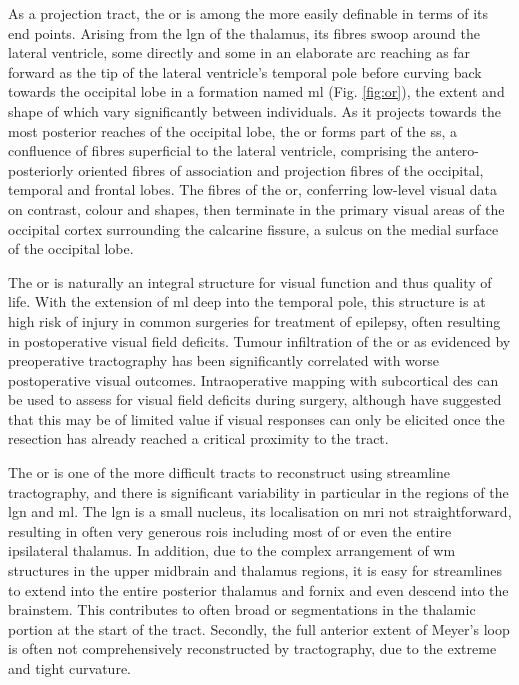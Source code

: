 As a projection tract, the \gls{or} is among the more easily definable in terms of its end points.
Arising from the \gls{lgn} of the thalamus, its fibres swoop around the lateral ventricle, some directly and some in an elaborate arc reaching as far forward as the tip of the lateral ventricle's temporal pole before curving back towards the occipital lobe in a formation named \gls{ml} (Fig. \ref{fig:or})\autocite{Sarubbo2015}, the extent and shape of which vary significantly between individuals\autocite{Ebeling1988,Yogarajah2009}.%
As it projects towards the most posterior reaches of the occipital lobe, the \gls{or} forms part of the \gls{ss}, a confluence of fibres superficial to the lateral ventricle, comprising the antero-posteriorly oriented fibres of association and projection fibres of the occipital, temporal and frontal lobes\autocite{Maldonado2021}.
The fibres of the \gls{or}, conferring low-level visual data on contrast, colour and shapes, then terminate in the primary visual areas of the occipital cortex surrounding the calcarine fissure, a sulcus on the medial surface of the occipital lobe.

The \gls{or} is naturally an integral structure for visual function and thus quality of life.
With the extension of \gls{ml} deep into the temporal pole, this structure is at high risk of injury in common surgeries for treatment of epilepsy, often resulting in postoperative visual field deficits\autocite{Lacerda2020}.
Tumour infiltration of the \gls{or} as evidenced by preoperative tractography has been significantly correlated with worse postoperative visual outcomes\autocite{Soumpasis2023}.
Intraoperative mapping with subcortical \gls{des} can be used to assess for visual field deficits during surgery\autocite{Duffau2004a,Mazerand2017}, although \textcite{Shahar2018} have suggested that this may be of limited value if visual responses can only be elicited once the resection has already reached a critical proximity to the tract.

The \gls{or} is one of the more difficult tracts to reconstruct using streamline tractography, and there is significant variability in particular in the regions of the \gls{lgn} and \gls{ml}.
The \gls{lgn} is a small nucleus, its localisation on \gls{mri} not straightforward, resulting in often very generous \glspl{roi} including most of or even the entire ipsilateral thalamus.
In addition, due to the complex arrangement of \gls{wm} structures in the upper midbrain and thalamus regions, it is easy for streamlines to extend into the entire posterior thalamus and fornix and even descend into the brainstem.
This contributes to often broad \gls{or} segmentations in the thalamic portion at the start of the tract.
Secondly, the full anterior extent of Meyer's loop is often not comprehensively reconstructed by tractography, due to the extreme and tight curvature\autocite{Lilja2015,Chamberland2018}.

